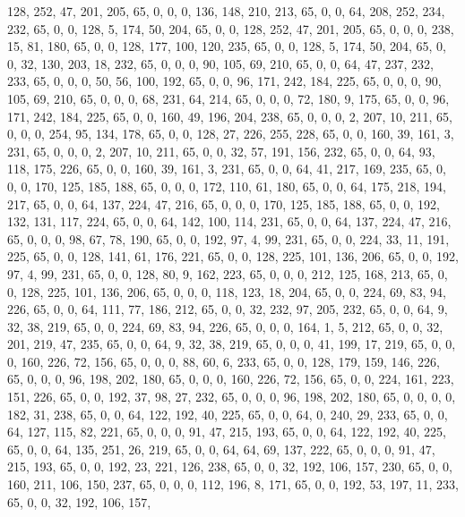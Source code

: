 \begin{DoxyCode}
       128, 252, 47, 201, 205, 65, 0, 0, 0, 136, 148, 210, 213, 65, 0, 0, 64, 208, 252, 234, 232, 65, 0, 0, 128, 5,
       174, 50, 204, 65, 0, 0, 128, 252, 47, 201, 205, 65, 0, 0, 0, 238, 15, 81, 180, 65, 0, 0, 128, 177, 100, 120,
       235, 65, 0, 0, 128, 5, 174, 50, 204, 65, 0, 0, 32, 130, 203, 18, 232, 65, 0, 0, 0, 90, 105, 69, 210, 65, 0,
       0, 64, 47, 237, 232, 233, 65, 0, 0, 0, 50, 56, 100, 192, 65, 0, 0, 96, 171, 242, 184, 225, 65, 0, 0, 0, 90,
       105, 69, 210, 65, 0, 0, 0, 68, 231, 64, 214, 65, 0, 0, 0, 72, 180, 9, 175, 65, 0, 0, 96, 171, 242, 184, 225,
       65, 0, 0, 160, 49, 196, 204, 238, 65, 0, 0, 0, 2, 207, 10, 211, 65, 0, 0, 0, 254, 95, 134, 178, 65, 0, 0,
       128, 27, 226, 255, 228, 65, 0, 0, 160, 39, 161, 3, 231, 65, 0, 0, 0, 2, 207, 10, 211, 65, 0, 0, 32, 57, 191,
       156, 232, 65, 0, 0, 64, 93, 118, 175, 226, 65, 0, 0, 160, 39, 161, 3, 231, 65, 0, 0, 64, 41, 217, 169, 235,
       65, 0, 0, 0, 170, 125, 185, 188, 65, 0, 0, 0, 172, 110, 61, 180, 65, 0, 0, 64, 175, 218, 194, 217, 65, 0, 0,
       64, 137, 224, 47, 216, 65, 0, 0, 0, 170, 125, 185, 188, 65, 0, 0, 192, 132, 131, 117, 224, 65, 0, 0, 64,
       142, 100, 114, 231, 65, 0, 0, 64, 137, 224, 47, 216, 65, 0, 0, 0, 98, 67, 78, 190, 65, 0, 0, 192, 97, 4, 99,
       231, 65, 0, 0, 224, 33, 11, 191, 225, 65, 0, 0, 128, 141, 61, 176, 221, 65, 0, 0, 128, 225, 101, 136, 206, 65,
       0, 0, 192, 97, 4, 99, 231, 65, 0, 0, 128, 80, 9, 162, 223, 65, 0, 0, 0, 212, 125, 168, 213, 65, 0, 0, 128,
       225, 101, 136, 206, 65, 0, 0, 0, 118, 123, 18, 204, 65, 0, 0, 224, 69, 83, 94, 226, 65, 0, 0, 64, 111, 77,
       186, 212, 65, 0, 0, 32, 232, 97, 205, 232, 65, 0, 0, 64, 9, 32, 38, 219, 65, 0, 0, 224, 69, 83, 94, 226, 65,
       0, 0, 0, 164, 1, 5, 212, 65, 0, 0, 32, 201, 219, 47, 235, 65, 0, 0, 64, 9, 32, 38, 219, 65, 0, 0, 0, 41,
       199, 17, 219, 65, 0, 0, 0, 160, 226, 72, 156, 65, 0, 0, 0, 88, 60, 6, 233, 65, 0, 0, 128, 179, 159, 146, 226,
       65, 0, 0, 0, 96, 198, 202, 180, 65, 0, 0, 0, 160, 226, 72, 156, 65, 0, 0, 224, 161, 223, 151, 226, 65, 0, 0,
       192, 37, 98, 27, 232, 65, 0, 0, 0, 96, 198, 202, 180, 65, 0, 0, 0, 0, 182, 31, 238, 65, 0, 0, 64, 122, 192,
       40, 225, 65, 0, 0, 64, 0, 240, 29, 233, 65, 0, 0, 64, 127, 115, 82, 221, 65, 0, 0, 0, 91, 47, 215, 193, 65,
       0, 0, 64, 122, 192, 40, 225, 65, 0, 0, 64, 135, 251, 26, 219, 65, 0, 0, 64, 64, 69, 137, 222, 65, 0, 0, 0,
       91, 47, 215, 193, 65, 0, 0, 192, 23, 221, 126, 238, 65, 0, 0, 32, 192, 106, 157, 230, 65, 0, 0, 160, 211,
       106, 150, 237, 65, 0, 0, 0, 112, 196, 8, 171, 65, 0, 0, 192, 53, 197, 11, 233, 65, 0, 0, 32, 192, 106, 157,

\end{DoxyCode}
